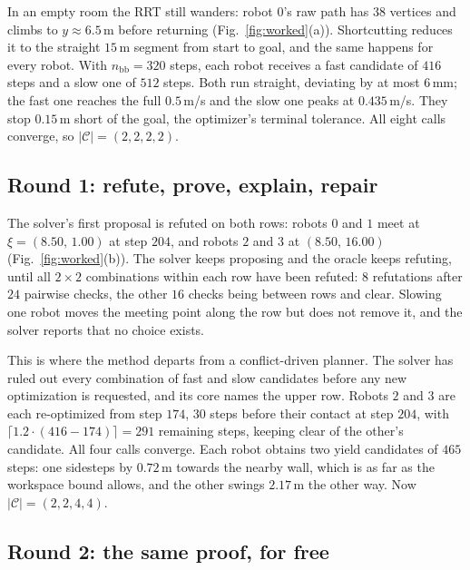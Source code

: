 \documentclass[conference]{IEEEtran}
\theoremstyle{plain}
\theoremstyle{definition}
\newcommand{\Cand}{\mathcal{C}}
\begin{document}
In an empty room the RRT still wanders: robot $0$'s raw path has $38$ vertices and climbs to
$y \approx 6.5$\,m before returning (Fig.~\ref{fig:worked}(a)). Shortcutting reduces it to the
straight $15$\,m segment from start to goal, and the same happens for every robot. With
$n_{\text{bb}} = 320$ steps, each robot receives a fast candidate of $416$ steps and a slow one
of $512$ steps. Both run straight, deviating by at most $6$\,mm; the fast one reaches the full
$0.5$\,m/s and the slow one peaks at $0.435$\,m/s. They stop $0.15$\,m short of the goal, the
optimizer's terminal tolerance. All eight calls converge, so $|\Cand| = (2,2,2,2)$.

\subsection{Round 1: refute, prove, explain, repair}

The solver's first proposal is refuted on both rows: robots $0$ and $1$ meet at
$\xi = (8.50,\,1.00)$ at step $204$, and robots $2$ and $3$ at $(8.50,\,16.00)$
(Fig.~\ref{fig:worked}(b)). The solver keeps proposing and the oracle keeps refuting, until all
$2 \times 2$ combinations within each row have been refuted: $8$ refutations after $24$ pairwise
checks, the other $16$ checks being between rows and clear. Slowing one robot moves the meeting
point along the row but does not remove it, and the solver reports that no choice exists.

This is where the method departs from a conflict-driven planner. The solver has ruled out every
combination of fast and slow candidates before any new optimization is requested, and its core
names the upper row. Robots $2$ and $3$ are each re-optimized from step $174$, $30$ steps
before their contact at step $204$, with $\lceil 1.2 \cdot (416-174) \rceil = 291$ remaining
steps, keeping clear of the other's candidate. All four calls converge. Each robot obtains two
yield candidates of $465$ steps: one sidesteps by $0.72$\,m towards the nearby wall, which is as
far as the workspace bound allows, and the other swings $2.17$\,m the other way. Now
$|\Cand| = (2,2,4,4)$.

\subsection{Round 2: the same proof, for free}
\end{document}
